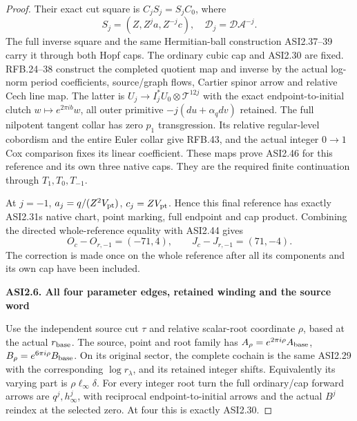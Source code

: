 \begin{proof}
Their exact cut square is
\(C_jS_j=S_jC_0\), where
\[
 S_j=(Z,Z^ja,Z^{-j}c),\quad
 \mathcal D_j=\mathcal D\mathcal A^{-j}.
 \tag{ASI2.51}
\]
The full inverse square and the same
Hermitian-ball construction ASI2.37--39
carry it through both Hopf caps. The
ordinary cubic cap and ASI2.30 are fixed.
RFB.24--38 construct the completed quotient
map and inverse by the actual log-norm
period coefficients, source/graph flows,
Cartier spinor arrow and relative Cech
line map. The latter is
\(U_j\to I_j^*U_0\otimes\mathcal T^{12j}\)
with the exact endpoint-to-initial clutch
\(w\mapsto e^{2\pi ib}w\), all outer
primitive \(-j(du+\alpha_qdv)\) retained.
The full nilpotent tangent collar has
zero \(p_1\) transgression. Its relative
regular-level cobordism and the entire
Euler collar give RFB.43, and the actual
integer \(0\to1\) Cox comparison fixes
its linear coefficient. These maps prove
ASI2.46 for this reference and its own
three native caps. They are the required
finite continuation through \(T_1,T_0,T_{-1}\).

At \(j=-1\), \(a_j=q/(Z^2V_{\rm pt})\),
\(c_j=ZV_{\rm pt}\). Hence this final
reference has exactly ASI2.31\textquotesingle s native
chart, point marking, full endpoint
and cap product. Combining the directed
whole-reference equality with ASI2.44 gives
\[
 O_c-O_{r,-1}=(-71,4),\qquad
                    J_c-J_{r,-1}=(71,-4).
 \tag{ASI2.52}
\]
The correction is made once on the whole
reference after all its components and
its own cap have been included.

\par

\medskip\noindent\textbf{ASI2.6. All four parameter edges, retained winding and the source word}

\par\nobreak

Use the independent source cut \(\tau\) and
relative scalar-root coordinate \(\rho\),
based at the actual \(r_{\rm base}\).
The source, point and root family has
\(A_\rho=e^{2\pi i\rho}A_{\rm base}\),
\(B_\rho=e^{6\pi i\rho}B_{\rm base}\).
On its original sector, the complete
cochain is the same ASI2.29 with the
corresponding \(\log r_\lambda\), and
its retained integer shifts. Equivalently
its varying part is \(\rho\ell_\infty\delta\).
For every integer root turn the full
ordinary/cap forward arrows are
\(q^j,h_\infty^j\), with reciprocal
endpoint-to-initial arrows and the
actual \(B^j\) reindex at the selected zero.
At four this is exactly ASI2.30.


\end{proof}
